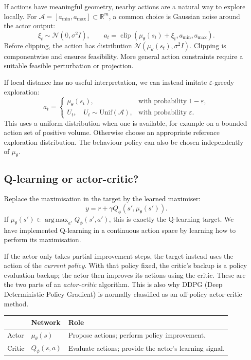 \documentclass[11pt,a4paper]{article}
\newcommand{\clip}{\operatorname{clip}}
\DeclareMathOperator*{\argmax}{arg\,max}
\begin{document}
If actions have meaningful geometry, nearby actions are a natural way to
explore locally. For $\mathcal A=[a_{\min},a_{\max}]\subset\mathbb R^m$,
a common choice is Gaussian noise around the actor output:
\begin{equation}\label{eq:exploration}
 \xi_t\sim\mathcal N(0,\sigma^2I),
 \qquad
 a_t=\clip\!\left(\mu_\theta(s_t)+\xi_t,a_{\min},a_{\max}\right).
\end{equation}
Before clipping, the action has distribution
$\mathcal N(\mu_\theta(s_t),\sigma^2I)$. Clipping is componentwise and ensures
feasibility. More general action constraints require a suitable feasible
perturbation or projection.

If local distance has no useful interpretation, we can instead imitate
$\varepsilon$-greedy exploration:
\begin{equation}
 a_t=
 \begin{cases}
  \mu_\theta(s_t),&\text{with probability }1-\varepsilon,\\
  U_t,\quad U_t\sim\mathrm{Unif}(\mathcal A),&
     \text{with probability }\varepsilon.
 \end{cases}
\end{equation}
This uses a uniform distribution when one is available, for example on a
bounded action set of positive volume. Otherwise choose an appropriate
reference exploration distribution. The behaviour policy can also be chosen
independently of $\mu_\theta$.

\subsection{Q-learning or actor-critic?}
Replace the maximisation in the target by the learned maximiser:
\begin{equation}\label{eq:actor-target}
 y=r+\gamma Q_\phi(s',\mu_\theta(s')).
\end{equation}
If $\mu_\theta(s')\in\argmax_{a'}Q_\phi(s',a')$, this is exactly the
Q-learning target. We have implemented Q-learning in a continuous action
space by learning how to perform its maximisation.

If the actor only takes partial improvement steps, the target instead uses
the action of the \emph{current policy}. With that policy fixed, the critic's
backup is a policy evaluation backup; the actor then improves its actions
using the critic. These are the two parts of an \emph{actor-critic} algorithm. This is also why {DDPG
(Deep Deterministic Policy Gradient)} is normally classified as an off-policy
actor-critic method.
\begin{center}
\begin{tabularx}{0.94\linewidth}{@{}llX@{}}
\toprule
 & \textbf{Network} & \textbf{Role}\\
\midrule
Actor & $\mu_\theta(s)$ & Propose actions; perform policy improvement.\\
Critic & $Q_\phi(s,a)$ & Evaluate actions; provide the actor's learning signal.\\
\bottomrule
\end{tabularx}
\end{center}
\end{document}
